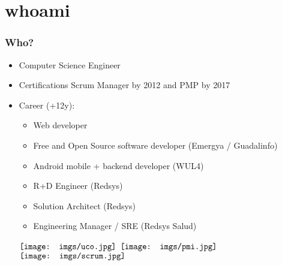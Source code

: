 \section{whoami}
\frame
{
\frametitle{Who?}
\begin{itemize}
\item Computer Science Engineer
\item Certifications Scrum Manager by 2012 and PMP by 2017
\item Career (+12y):
	\begin{itemize}
		\item Web developer
		\item Free and Open Source software developer (Emergya / Guadalinfo)
		\item Android mobile + backend developer (WUL4)
		\item R+D Engineer (Redsys)
		\item Solution Architect (Redsys)
		\item Engineering Manager / SRE (Redsys Salud)
	\end{itemize}
\begin{center}
  $\vcenter{\hbox{\texttt{[image: imgs/uco.jpg]}}}$
  $\vcenter{\hbox{\texttt{[image: imgs/pmi.jpg]}}}$
  $\vcenter{\hbox{\texttt{[image: imgs/scrum.jpg]}}}$
\end{center}
\end{itemize}
}
